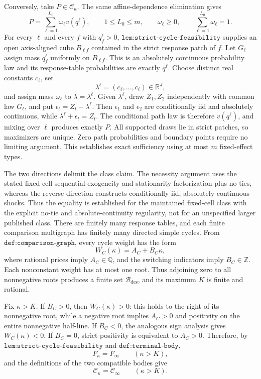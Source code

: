 Conversely, take \(P\in\mathcal C_\kappa\).  The same affine-dependence elimination gives
\[
 P=\sum_{\ell=1}^{L_0}\omega_\ell v(q^\ell),
 \qquad
 1\le L_0\le m,
 \qquad
 \omega_\ell\ge0,
 \qquad
 \sum_{\ell=1}^{L_0}\omega_\ell=1.
\]
For every \(\ell\) and every \(f\) with \(q_f^\ell>0\), \(\texttt{lem:strict-cycle-feasibility}\) supplies an open axis-aligned cube \(B_{\ell f}\) contained in the strict response patch of \(f\).  Let \(G_\ell\) assign mass \(q_f^\ell\) uniformly on \(B_{\ell f}\).  This is an absolutely continuous probability law and its response-table probabilities are exactly \(q^\ell\).  Choose distinct real constants \(c_\ell\), set
\[
 \lambda^\ell=(c_\ell,\ldots,c_\ell)\in\mathbb R^J,
\]
and assign mass \(\omega_\ell\) to \(\lambda=\lambda^\ell\).  Given \(\lambda^\ell\), draw \(Z_1,Z_2\) independently with common law \(G_\ell\), and put \(\epsilon_t=Z_t-\lambda^\ell\).  Then \(\epsilon_1\) and \(\epsilon_2\) are conditionally iid and absolutely continuous, while \(\lambda^\ell+\epsilon_t=Z_t\).  The conditional path law is therefore \(v(q^\ell)\), and mixing over \(\ell\) produces exactly \(P\).  All supported draws lie in strict patches, so maximizers are unique.  Zero path probabilities and boundary points require no limiting argument.  This establishes exact sufficiency using at most \(m\) fixed-effect types.

The two directions delimit the class claim.  The necessity argument uses the stated fixed-cell sequential-exogeneity and stationarity factorization plus no ties, whereas the reverse direction constructs conditionally iid, absolutely continuous shocks.  Thus the equality is established for the maintained fixed-cell class with the explicit no-tie and absolute-continuity regularity, not for an unspecified larger published class.
There are finitely many response tables, and each finite comparison multigraph has finitely many directed simple cycles.  From \(\texttt{def:comparison-graph}\), every cycle weight has the form
\[
 W_C(\kappa)=A_C+B_C\kappa,
\]
where rational prices imply \(A_C\in\mathbb Q\), and the switching indicators imply \(B_C\in\mathbb Z\).  Each nonconstant weight has at most one root.  Thus adjoining zero to all nonnegative roots produces a finite set \(\mathcal B_{\mathrm{des}}\), and its maximum \(K\) is finite and rational.

Fix \(\kappa>K\).  If \(B_C>0\), then \(W_C(\kappa)>0\): this holds to the right of its nonnegative root, while a negative root implies \(A_C>0\) and positivity on the entire nonnegative half-line.  If \(B_C<0\), the analogous sign analysis gives \(W_C(\kappa)<0\).  If \(B_C=0\), strict positivity is equivalent to \(A_C>0\).  Therefore, by \(\texttt{lem:strict-cycle-feasibility}\) and \(\texttt{def:terminal-body}\),
\[
 F_\kappa=F_\infty\qquad(\kappa>K),
\]
and the definitions of the two compatible bodies give
\[
 \mathcal C_\kappa=\mathcal C_\infty\qquad(\kappa>K).
\]

